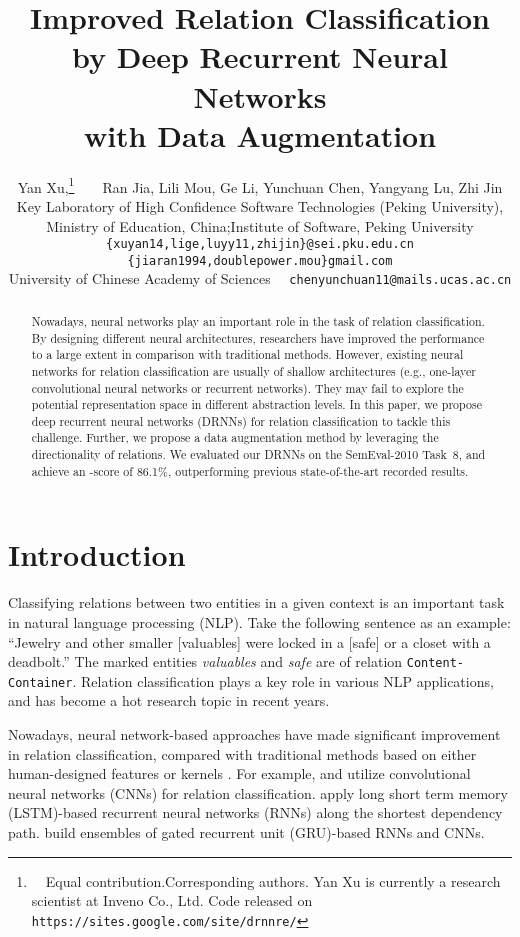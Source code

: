 \documentclass[11pt]{article}
\title{Improved Relation Classification by Deep Recurrent Neural Networks\\
 with Data Augmentation}
\author{Yan Xu,\thanks{\ \ Equal contribution.\quad Corresponding authors.
\quad Yan Xu is currently a research scientist at Inveno Co., Ltd.\quad\hspace{1cm}{\color{white}{.}} 
{\color{white}{.}}\hspace{.4cm} Code released on \texttt{https://sites.google.com/site/drnnre/}}\ \ \ \  Ran Jia, Lili Mou, Ge Li, Yunchuan Chen, Yangyang Lu, Zhi Jin\\
Key Laboratory of High Confidence Software Technologies (Peking University),\\ Ministry of Education, China;\quad Institute of Software, Peking University\\
{\tt \{xuyan14,lige,luyy11,zhijin\}@sei.pku.edu.cn}\\
{\tt\{jiaran1994,doublepower.mou\}gmail.com}\\
University of Chinese Academy of Sciences\ \ { \texttt{chenyunchuan11@mails.ucas.ac.cn}}\\ 
}
\date{}
\begin{document}
\maketitle
\begin{abstract}
  Nowadays, neural networks play an important role in the task of relation classification.
By designing different neural architectures, researchers have improved the performance to a large extent in comparison with traditional methods. However, existing neural networks for relation classification are usually of shallow architectures (e.g., one-layer convolutional neural networks or recurrent networks). They may fail to explore the potential representation space in different abstraction levels. In this paper, we propose deep recurrent neural networks (DRNNs) for relation classification to tackle this challenge. Further, we propose a data augmentation method by leveraging the directionality of relations. We evaluated our DRNNs on the SemEval-2010 Task~8, and achieve an -score of 86.1\%, outperforming previous state-of-the-art recorded results.
\end{abstract}

\section{Introduction}
Classifying relations between two entities in a given context is an important task in natural language processing (NLP). Take the following sentence as an example: ``Jewelry and other smaller [valuables] were locked in a [safe] or a closet with a deadbolt.'' The marked entities \textit{valuables} and \textit{safe} are of relation {\tt Content-Container}. Relation classification plays a key role in various NLP applications, and has become a hot research topic in recent years.

Nowadays, neural network-based approaches have made significant improvement in relation classification, compared with traditional methods based on either human-designed features \cite{MaxEntRE,2010SVM} or kernels \cite{SpdKernel,EmbedTreeK}. For example,  and  utilize convolutional neural networks (CNNs) for relation classification.  apply long short term memory (LSTM)-based recurrent neural networks (RNNs) along the shortest dependency path.  build ensembles of gated recurrent unit (GRU)-based RNNs and CNNs.
\end{document}
